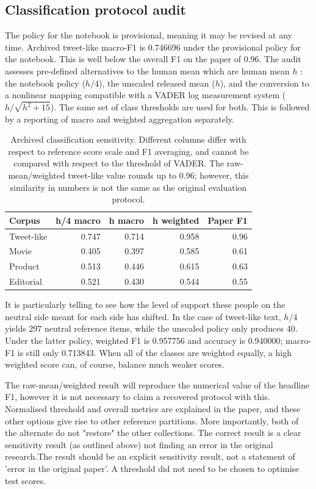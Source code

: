 \documentclass[11pt]{article}
\begin{document}
\subsection{Classification protocol audit}

The policy for the notebook is provisional, meaning it may be revised at any time. Archived tweet-like macro-F1 is 0.746696 under the provisional policy for the notebook. This is well below the overall F1 on the paper of 0.96. The audit assesses pre-defined alternatives to the human mean which are human mean $h$ : the notebook policy ($h/4$), the unscaled released mean ($h$), and the conversion to a nonlinear mapping compatible with a VADER log measurement system ($h/\sqrt{h^2+15}$). The same set of class thresholds are used for both. This is followed by a reporting of macro and weighted aggregation separately.


\begin{table}[t]
\centering\small
\setlength{\tabcolsep}{5pt}
\begin{tabular}{@{}lrrrr@{}}
\toprule
Corpus & h/4 macro & h macro & h weighted & Paper F1\\
\midrule
Tweet-like & 0.747 & 0.714 & 0.958 & 0.96\\
Movie & 0.405 & 0.397 & 0.585 & 0.61\\
Product & 0.513 & 0.446 & 0.615 & 0.63\\
Editorial & 0.521 & 0.430 & 0.544 & 0.55\\
\bottomrule
\end{tabular}
\caption{Archived classification sensitivity. Different columns differ with respect to reference score scale and F1 averaging, and cannot be compared with respect to the threshold of VADER. The raw-mean/weighted tweet-like value rounds up to 0.96; however, this similarity in numbers is not the same as the original evaluation protocol.}
\label{tab:user3}
\end{table}

It is particularly telling to see how the level of support these people on the neutral side meant for each side has shifted. In the case of tweet-like text, $h/4$ yields 297 neutral reference items, while the unscaled policy only produces 40. Under the latter policy, weighted F1 is 0.957756 and accuracy is 0.940000; macro-F1 is still only 0.713843. When all of the classes are weighted equally, a high weighted score can, of course, balance much weaker scores.


The raw-mean/weighted result will reproduce the numerical value of the headline F1, however it is not necessary to claim a recovered protocol with this. Normalised threshold and overall metrics are explained in the paper, and these other options give rise to other reference partitions. More importantly, both of the alternate do not "restore" the other collections. The correct result is a clear sensitivity result (as outlined above) not finding an error in the original research.The result should be an explicit sensitivity result, not a statement of 'error in the original paper'. A threshold did not need to be chosen to optimise test scores.
\end{document}
